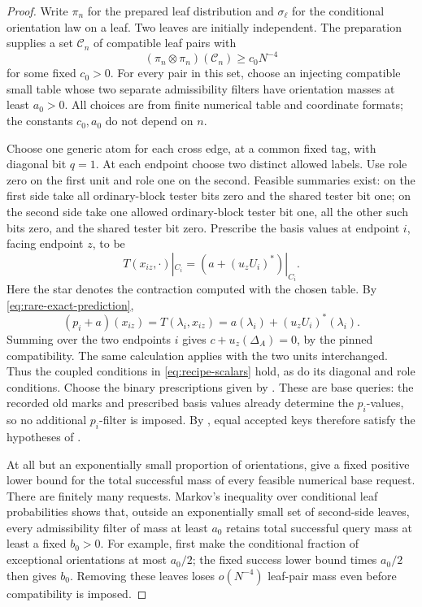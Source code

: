 \begin{proof}
Write \(\pi_n\) for the prepared leaf distribution and
\(\sigma_\ell\) for the conditional orientation law on a leaf.
Two leaves are initially independent.
The preparation supplies a set \(\mathcal C_n\) of compatible leaf
pairs with
\[
       (\pi_n\otimes\pi_n)(\mathcal C_n)\ge c_0N^{-4}
\]
for some fixed \(c_0>0\).
For every pair in this set, choose an injecting compatible small
table whose two separate admissibility filters have orientation
masses at least \(a_0>0\).
All choices are from finite numerical table and coordinate formats;
the constants \(c_0,a_0\) do not depend on \(n\).

Choose one generic atom for each cross edge, at a common fixed tag,
with diagonal bit \(q=1\).
At each endpoint choose two distinct allowed labels.
Use role zero on the first unit and role one on the second.
Feasible summaries exist: on the first side take all ordinary-block
tester bits zero and the shared tester bit one; on the second side
take one allowed ordinary-block tester bit one, all the other such
bits zero, and the shared tester bit zero.
Prescribe the basis values at endpoint \(i\), facing endpoint \(z\),
to be
\[
             T(x_{iz},\cdot)|_{C_i}
              =(a+(u_zU_i)^*)|_{C_i}.
\]
Here the star denotes the contraction computed with the chosen table.
By \eqref{eq:rare-exact-prediction},
\[
 (p_i+a)(x_{iz})
   =T(\lambda_i,x_{iz})
   =a(\lambda_i)+(u_zU_i)^*(\lambda_i).
\]
Summing over the two endpoints \(i\) gives
\(c+u_z(\Delta_A)=0\), by the pinned compatibility.
The same calculation applies with the two units interchanged.
Thus the coupled conditions in \eqref{eq:recipe-scalars} hold,
as do its diagonal and role conditions.
Choose the binary prescriptions given by .
These are base queries: the recorded old marks and prescribed basis
values already determine the \(p_i\)-values, so no additional
\(p_i\)-filter is imposed.
By , equal accepted keys therefore
satisfy the hypotheses of .

At all but an exponentially small proportion of orientations,
 give a fixed positive
lower bound for the total successful mass of every feasible numerical
base request.  There are finitely many requests.
Markov's inequality over conditional leaf probabilities shows that,
outside an exponentially small set of second-side leaves, every
admissibility filter of mass at least \(a_0\) retains total successful
query mass at least a fixed \(b_0>0\).
For example, first make the conditional fraction of exceptional
orientations at most \(a_0/2\); the fixed success lower bound times
\(a_0/2\) then gives \(b_0\).
Removing these leaves loses \(o(N^{-4})\) leaf-pair mass even before
compatibility is imposed.


\end{proof}
